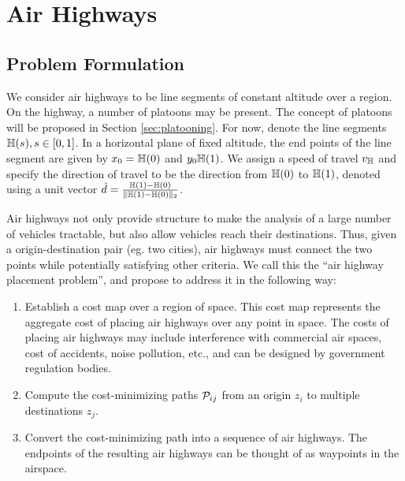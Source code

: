 \section{Air Highways}
\subsection{Problem Formulation}
We consider air highways to be line segments of constant altitude over a region. On the highway, a number of platoons may be present. The concept of platoons will be proposed in Section \ref{sec:platooning}. For now, denote the line segments $\mathbb{H}(s), s\in[0,1]$. In a horizontal plane of fixed altitude, the end points of the line segment are given by $x_0 = \mathbb{H}(0)$ and $y_0\mathbb{H}(1)$. We assign a speed of travel $v_{\mathbb{H}}$ and specify the direction of travel to be the direction from $\mathbb{H}(0)$ to $\mathbb{H}(1)$, denoted using a unit vector $\hat{d} = \frac{\mathbb{H}(1) - \mathbb{H}(0)}{\lVert\mathbb{H}(1) - \mathbb{H}(0)\rVert_2}$.

Air highways not only provide structure to make the analysis of a large number of vehicles tractable, but also allow vehicles reach their destinations. Thus, given a origin-destination pair (eg. two cities), air highways must connect the two points while potentially satisfying other criteria. We call this the ``air highway placement problem'', and propose to address it in the following way:

\begin{enumerate}
\item Establish a cost map over a region of space. This cost map represents the aggregate cost of placing air highways over any point in space. The costs of placing air highways may include interference with commercial air spaces, cost of accidents, noise pollution, etc., and can be designed by government regulation bodies.
\item Compute the cost-minimizing paths $\mathcal{P}_{ij}$ from an origin $z_i$ to multiple destinations $z_j$. 
\item Convert the cost-minimizing path into a sequence of air highways. The endpoints of the resulting air highways can be thought of as waypoints in the airspace.
\end{enumerate}